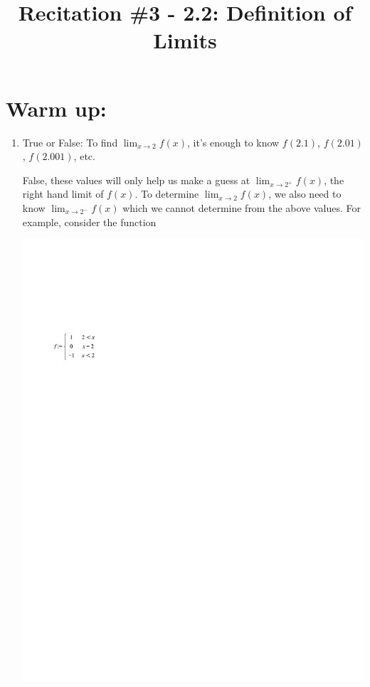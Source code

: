 \documentclass[handout,nooutcomes]{ximera}
\title{Recitation \#3 - 2.2:  Definition of Limits}
\begin{document}
\begin{abstract}		\end{abstract}
\maketitle

\section*{Warm up:} 

	\begin{enumerate}[label=(\alph*)]
	
	\item  True or False: To find $\lim_{x \to 2} f(x)$, it's enough to know $f(2.1)$, $f(2.01)$, $f(2.001)$, etc.
	\begin{freeResponse}
	 False, these values will only help us make a guess at $\lim_{x \to 2^+} f(x)$, the right hand limit of $f(x)$.  To determine $\lim_{x \to 2} f(x)$, we also need to know $\lim_{x \to 2^-} f(x)$ which we cannot determine from the above values.  For example, consider the function
	 	\begin{image}
	 	\includegraphics[trim= 70 570 300 165]{Figure2.pdf}
	 	\end{image}
	 	

\end{freeResponse}
\end{enumerate}
\end{document}
